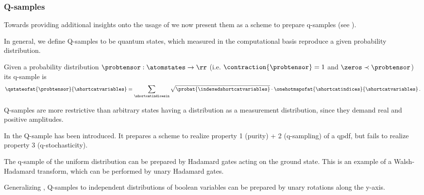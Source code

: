 
\subsubsection{Q-samples}

Towards providing additional insights onto the usage of \activationCircuits{} we now present them as a scheme to prepare q-samples (see \cite{low_quantum_2014}).


In general, we define Q-samples to be quantum states, which measured in the computational basis reproduce a given probability distribution.

\begin{definition}[Q-sample]
    Given a probability distribution $\probtensor:\atomstates\rightarrow\rr$ (i.e. $\contraction{\probtensor}=1$ and $\zeros \prec \probtensor$) its q-sample is
    \begin{align*}
        \qstateofat{\probtensor}{\shortcatvariables}
        = \sum_{\shortcatindicesin} \sqrt{\probat{\indexedshortcatvariables}} \cdot \onehotmapofat{\shortcatindices}{\shortcatvariables} \, .
    \end{align*}
\end{definition}

Q-samples are more restrictive than arbitrary states having a distribution as a measurement distribution, since they demand real and positive amplitudes.

In \cite{low_quantum_2014} the Q-sample has been introduced.
It prepares a scheme to realize property 1 (purity) + 2 (q-sampling) of a qpdf, but fails to realize property 3 (q-stochasticity).

\begin{example}
    \label{exa:qSampleUniform}
    The q-sample of the uniform distribution can be prepared by Hadamard gates acting on the ground state.
    This is an example of a Walsh-Hadamard transform, which can be performed by unary Hadamard gates.
\end{example}

Generalizing , Q-samples to independent distributions of boolean variables can be prepared by unary rotations along the y-axis.


